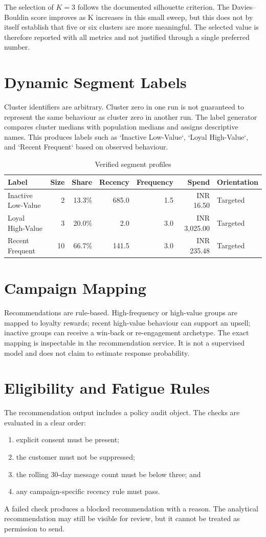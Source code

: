 \documentclass[12pt,a4paper]{report}
\begin{document}
The selection of $K=3$ follows the documented silhouette criterion. The Davies--Bouldin score improves as K increases in this small sweep, but this does not by itself establish that five or six clusters are more meaningful. The selected value is therefore reported with all metrics and not justified through a single preferred number.

\section{Dynamic Segment Labels}
Cluster identifiers are arbitrary. Cluster zero in one run is not guaranteed to represent the same behaviour as cluster zero in another run. The label generator compares cluster medians with population medians and assigns descriptive names. This produces labels such as `Inactive Low-Value`, `Loyal High-Value`, and `Recent Frequent` based on observed behaviour.

\begin{table}[H]
\centering
\caption{Verified segment profiles}\label{tab:segments}
\begin{tabular}{p{}r r r r r p{}}
\toprule
Label & Size & Share & Recency & Frequency & Spend & Orientation\\\midrule
Inactive Low-Value & 2 & 13.3\% & 685.0 & 1.5 & INR 16.50 & Targeted\\
Loyal High-Value & 3 & 20.0\% & 2.0 & 3.0 & INR 3,025.00 & Targeted\\
Recent Frequent & 10 & 66.7\% & 141.5 & 3.0 & INR 235.48 & Targeted\\\bottomrule
\end{tabular}
\end{table}

\section{Campaign Mapping}
Recommendations are rule-based. High-frequency or high-value groups are mapped to loyalty rewards; recent high-value behaviour can support an upsell; inactive groups can receive a win-back or re-engagement archetype. The exact mapping is inspectable in the recommendation service. It is not a supervised model and does not claim to estimate response probability.

\section{Eligibility and Fatigue Rules}
The recommendation output includes a policy audit object. The checks are evaluated in a clear order:
\begin{enumerate}
\item explicit consent must be present;
\item the customer must not be suppressed;
\item the rolling 30-day message count must be below three; and
\item any campaign-specific recency rule must pass.
\end{enumerate}
A failed check produces a blocked recommendation with a reason. The analytical recommendation may still be visible for review, but it cannot be treated as permission to send.
\end{document}
